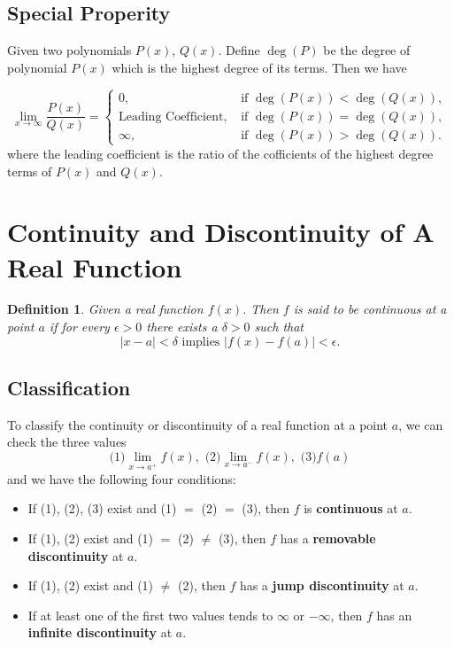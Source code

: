 \documentclass[12pt]{article}
\newtheorem{definition}[theorem]{Definition}
\begin{document}
\subsection{Special Properity}

Given two polynomials $P(x)$, $Q(x)$. Define $\deg(P)$ be the degree of  polynomial $P(x)$ 
which is the highest degree of its terms. Then we have

\[
\lim_{x \to \infty }\dfrac{P(x)}{Q(x)}=
\begin{cases}
0,             & \text{ if } \deg(P(x)) < \deg(Q(x)),\\
\text{Leading Coefficient}, & \text{ if }\deg(P(x)) = \deg(Q(x)),\\
\infty,       &  \text{ if } \deg(P(x)) > \deg(Q(x)).
\end{cases}
\]
where the leading coefficient is the ratio of the cofficients of the highest degree terms of $P(x)$ and $Q(x)$.


\section{Continuity and Discontinuity of A Real Function}

\begin{definition}
Given a real function $f(x)$. Then $f$ is said to be continuous at a point $a$ if 
for every $\epsilon >0$ there exists a $\delta >0 $ such that 
$$|x-a| < \delta  \text{ implies } |f(x)-f(a)| < \epsilon.$$
\end{definition}

\subsection{Classification}
To classify the continuity or discontinuity of a real function at a point $a$, 
we can check the three values
$$\text{(1)}\lim_{x \to a^+}f(x), \text{ (2)}\lim_{x \to a^-}f(x), \text{ (3)}f(a)$$ 
and we have the following four conditions:
\begin{itemize}
\item If (1), (2), (3) exist and (1) $=$ (2) $=$ (3), then $f$ is {\bf continuous} at $a$.

\item If (1), (2) exist and (1) $=$ (2) $\neq$ (3), then $f$ has a {\bf removable discontinuity} at $a$.

\item If (1), (2) exist and (1) $\neq$ (2), then $f$ has a {\bf jump discontinuity} at $a$.

\item If at least one of the first two values tends to $\infty$ or $-\infty$, 
then $f$ has an {\bf infinite discontinuity} at $a$.

\end{itemize}
\end{document}
